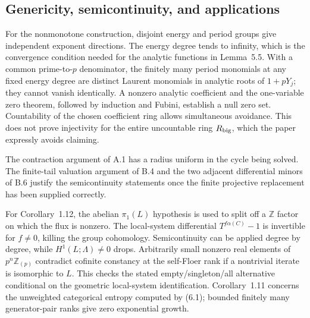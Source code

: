 \documentclass[10pt]{article}
\begin{document}
\subsection*{Genericity, semicontinuity, and applications}
For the nonmonotone construction, disjoint energy and period groups give independent exponent directions. The energy degree tends to infinity, which is the convergence condition needed for the analytic functions in Lemma 5.5. With a common prime-to-\(p\) denominator, the finitely many period monomials at any fixed energy degree are distinct Laurent monomials in analytic roots of \(1+pY_j\); they cannot vanish identically. A nonzero analytic coefficient and the one-variable zero theorem, followed by induction and Fubini, establish a null zero set. Countability of the chosen coefficient ring allows simultaneous avoidance. This does not prove injectivity for the entire uncountable ring \(R_{\rm big}\), which the paper expressly avoids claiming.\par
The contraction argument of A.1 has a radius uniform in the cycle being solved. The finite-tail valuation argument of B.4 and the two adjacent differential minors of B.6 justify the semicontinuity statements once the finite projective replacement has been supplied correctly.\par
For Corollary 1.12, the abelian \(\pi_1(L)\) hypothesis is used to split off a \(\mathbb Z\) factor on which the flux is nonzero. The local-system differential \(T^{f\alpha(C)}-1\) is invertible for \(f\ne0\), killing the group cohomology. Semicontinuity can be applied degree by degree, while \(H^1(L;\Lambda)\ne0\) drops. Arbitrarily small nonzero real elements of \(p^n\mathbb Z_{(p)}\) contradict cofinite constancy at the self-Floer rank if a nontrivial iterate is isomorphic to \(L\). This checks the stated empty/singleton/all alternative conditional on the geometric local-system identification. Corollary 1.11 concerns the unweighted categorical entropy computed by (6.1); bounded finitely many generator-pair ranks give zero exponential growth.\par
\end{document}
